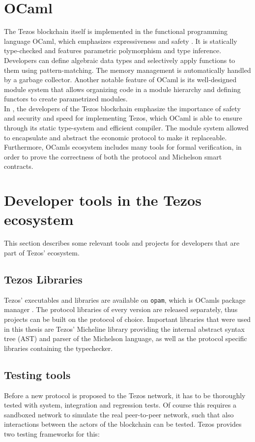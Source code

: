 
\section{OCaml}
The Tezos blockchain itself is implemented in the functional programming language OCaml, which emphasizes expressiveness and safety \cite{ocaml_doc}. It is statically type-checked and features parametric polymorphism and type inference. Developers can define algebraic data types and selectively apply functions to them using pattern-matching. The memory management is automatically handled by a garbage collector. Another notable feature of OCaml is its well-designed module system that allows organizing code in a module hierarchy and defining functors to create parametrized modules.\\
In \cite{canou_tezos_nodate}, the developers of the Tezos blockchain emphasize the importance of safety and security and speed for implementing Tezos, which OCaml is able to ensure through its static type-system and efficient compiler. The module system allowed to encapsulate and abstract the economic protocol to make it replaceable. Furthermore, OCamls ecosystem includes many tools for formal verification, in order to prove the correctness of both the protocol and Michelson smart contracts.


\section{Developer tools in the Tezos ecosystem}
This section describes some relevant tools and projects for developers that are part of Tezos' ecosystem.

\subsection{Tezos Libraries}
Tezos' executables and libraries are available on \texttt{opam}, which is OCamls package manager \cite{tezos_opam}. The protocol libraries of every version are released separately, thus projects can be built on the protocol of choice. Important libraries that were used in this thesis are Tezos' Micheline library providing the internal abstract syntax tree (AST) and parser of the Michelson language, as well as the protocol specific libraries containing the typechecker.

\subsection{Testing tools}
Before a new protocol is proposed to the Tezos network, it has to be thoroughly tested with system, integration and regression tests. Of course this requires a sandboxed network to simulate the real peer-to-peer network, such that also interactions between the actors of the blockchain can be tested. Tezos provides two testing frameworks for this:

